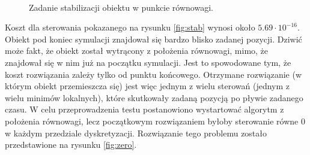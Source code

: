 \begin{figure}[H]
	~~
	\caption{Zadanie stabilizacji obiektu w punkcie równowagi.}
	\label{fig:equ}
\end{figure}

Koszt dla sterowania pokazanego na rysunku \ref{fig:stab} wynosi około \(5.69 \cdot 10^{-16}\). Obiekt pod koniec symulacji znajdował się bardzo blisko zadanej pozycji. Dziwić może fakt, że obiekt został wytrącony z położenia równowagi, mimo, że znajdował się w nim już na początku symulacji. Jest to spowodowane tym, że koszt rozwiązania zależy tylko od punktu końcowego. Otrzymane rozwiązanie (w którym obiekt przemieszcza się) jest więc jednym z wielu sterowań (jednym z wielu minimów lokalnych), które skutkowały zadaną pozycją po pływie zadanego czasu. W celu przeprowadzenia testu postanowiono wystartować algorytm z położenia równowagi, lecz początkowym rozwiązaniem byłoby sterowanie równe 0 w każdym przedziale dyskretyzacji.
Rozwiązanie tego problemu zostało przedstawione na rysunku \ref{fig:zero}.

